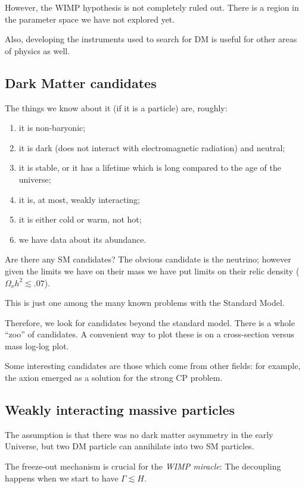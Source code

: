 \documentclass[main.tex]{subfiles}
\begin{document}
However, the WIMP hypothesis is not completely ruled out.
There is a region in the parameter space we have not explored yet. 

Also, developing the instruments used to search for DM is useful for other areas of 
physics as well. 

\subsection{Dark Matter candidates}

The things we know about it (if it is a particle) are, roughly: 
\begin{enumerate}
    \item it is non-baryonic;
    \item it is dark (does not interact with electromagnetic radiation) and neutral;
    \item it is stable, or it has a lifetime which is long compared to the age of the universe;
    \item it is, at most, weakly interacting;
    \item it is either cold or warm, not hot;
    \item we have data about its abundance. 
\end{enumerate}

Are there any SM candidates? 
The obvious candidate is the neutrino; however given the limits we have on their mass 
we have put limits on their relic density (\(\Omega_\nu h^2 \lesssim \num{.07}\)). 

This is just one among the many known problems with the Standard Model. 

Therefore, we look for candidates beyond the standard model. 
There is a whole ``zoo'' of candidates. 
A convenient way to plot these is on a cross-section versus mass log-log plot.

Some interesting candidates are those which come from other fields: 
for example, the axion emerged as a solution for the strong CP problem. 

\subsection{Weakly interacting massive particles}

The assumption is that there was no dark matter asymmetry in the early Universe,
but two DM particle can annihilate into two SM particles. 

The freeze-out mechanism is crucial for the \emph{WIMP miracle}: 
The decoupling happens when we start to have \(\Gamma \lesssim H\). 
\end{document}
